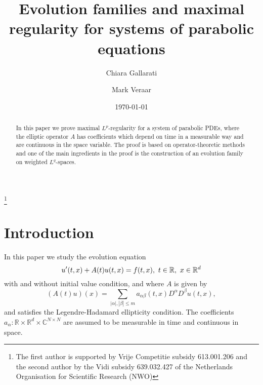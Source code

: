 \documentclass{amsart}
\theoremstyle{plain}
\theoremstyle{remark}
\theoremstyle{plain}
\numberwithin{equation}{section}
\begin{document}

\author{Chiara Gallarati}
\address{Delft Institute of Applied Mathematics\\
Delft University of Technology \\ P.O. Box 5031\\ 2600 GA Delft\\The
Netherlands} 

\author{Mark Veraar}

\date\today

\title
[Evolution families and maximal regularity for systems]{Evolution families and maximal regularity for systems of parabolic equations}

\begin{abstract}
In this paper we prove maximal $L^p$-regularity for a system of parabolic PDEs, where the elliptic operator $A$ has coefficients which depend on time in a measurable way and are continuous in the space variable. The proof is based on operator-theoretic methods and one of the main ingredients in the proof is the construction of an evolution family on weighted $L^q$-spaces.
\end{abstract}



\thanks{The first author is supported by Vrije Competitie subsidy 613.001.206 and the second author by the Vidi subsidy 639.032.427 of the Netherlands Organisation for Scientific Research (NWO)}

\maketitle

\section{Introduction}

In this paper we study the evolution equation
\begin{equation}\label{prob:systemintro}
u'(t,x)+A(t)u(t,x)=f(t,x),\ t\in{ \mathbb{R} },\ x\in{ \mathbb{R} }^{d}\\
\end{equation}
with and without initial value condition, and where $A$ is given by
\begin{equation} 
(A(t) u)(x) = \sum_{|\alpha|, |\beta|\leq m}  a_{\alpha\beta}(t,x)D^{\alpha} D^\beta u(t,x),
\nonumber
\end{equation}
and satisfies the Legendre-Hadamard ellipticity condition. The coefficients $a_{\alpha}:{ \mathbb{R} }\times { \mathbb{R} }^d\times { \mathbb{C} }^{N\times N}$ are assumed to be measurable in time and continuous in space.
\end{document}
